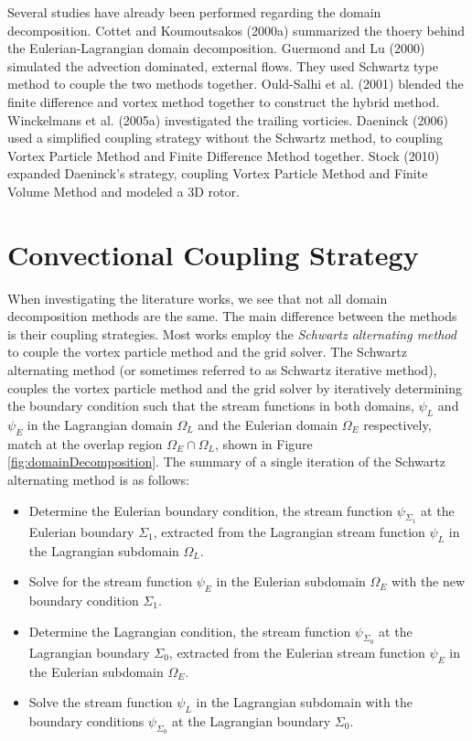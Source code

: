 	Several studies have already been performed regarding the domain decomposition. Cottet and Koumoutsakos (2000a)\cite{Cottet2000a} summarized the thoery behind the Eulerian-Lagrangian domain decomposition. Guermond and Lu (2000) \cite{Guermond2000a} simulated the advection dominated, external flows. They used Schwartz type method to couple the two methods together. Ould-Salhi et al. (2001) \cite{Ould-Salihi2001a} blended the finite difference and vortex method together to construct the hybrid method. Winckelmans et al. (2005a) \cite{Winckelmans2005} investigated the trailing vorticies. Daeninck (2006) \cite{Daeninck2006} used a simplified coupling strategy without the Schwartz method, to coupling Vortex Particle Method and Finite Difference Method together. Stock (2010) \cite{Stock2010a} expanded Daeninck's strategy, coupling Vortex Particle Method and Finite Volume Method and modeled a 3D rotor.

	\section{Convectional Coupling Strategy}
	\label{sec:helvpm-ccs}
	
	When investigating the literature works, we see that not all domain decomposition methods are the same. The main difference between the methods is their coupling strategies. Most works employ the\textit{ Schwartz alternating method} to couple the vortex particle method and the grid solver. The Schwartz alternating method (or sometimes referred to as Schwartz iterative method), couples the vortex particle method and the grid solver by iteratively determining the boundary condition such that the stream functions in both domains, $\psi_L$ and $\psi_E$ in the Lagrangian domain $\Omega_L$ and the Eulerian domain $\Omega_E$ respectively, match at the overlap region $\Omega_E\cap\Omega_L$, shown in Figure \ref{fig:domainDecomposition}. The summary of a single iteration of the Schwartz alternating method is as follows:
	
		\begin{itemize}
		\item Determine the Eulerian boundary condition, the stream function $\psi_{\Sigma_1}$ at the Eulerian boundary $\Sigma_1$, extracted from the Lagrangian stream function $\psi_L$ in the Lagrangian subdomain $\Omega_L$.
		\item Solve for the stream function $\psi_E$ in the Eulerian subdomain $\Omega_E$ with the new boundary condition $\Sigma_1$.
		\item Determine the Lagrangian condition, the stream function $\psi_{\Sigma_0}$ at the Lagrangian boundary $\Sigma_0$, extracted from the Eulerian stream function $\psi_E$ in the Eulerian subdomain $\Omega_E$.
		\item Solve the stream function $\psi_L$ in the Lagrangian subdomain with the boundary conditions $\psi_{\Sigma_0}$ at the Lagrangian boundary $\Sigma_0$.
		\end{itemize}
	
